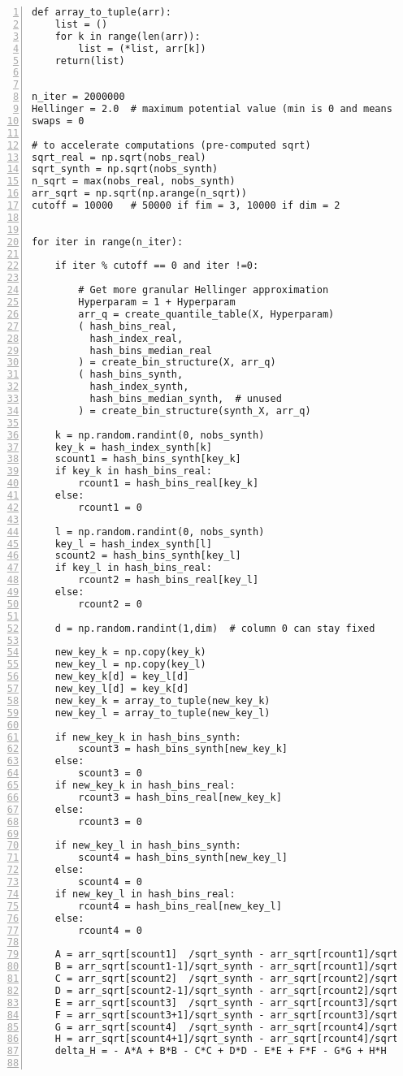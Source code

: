 \documentclass[oneside,10pt]{book}
\begin{document}
\begin{lstlisting}[numbers=left]
def array_to_tuple(arr):
    list = ()
    for k in range(len(arr)):
        list = (*list, arr[k])
    return(list)


n_iter = 2000000  
Hellinger = 2.0  # maximum potential value (min is 0 and means perfect fit)
swaps = 0

# to accelerate computations (pre-computed sqrt)
sqrt_real = np.sqrt(nobs_real)
sqrt_synth = np.sqrt(nobs_synth)
n_sqrt = max(nobs_real, nobs_synth) 
arr_sqrt = np.sqrt(np.arange(n_sqrt))
cutoff = 10000   # 50000 if fim = 3, 10000 if dim = 2


for iter in range(n_iter):

    if iter % cutoff == 0 and iter !=0:   

        # Get more granular Hellinger approximation
        Hyperparam = 1 + Hyperparam   
        arr_q = create_quantile_table(X, Hyperparam)
        ( hash_bins_real, 
          hash_index_real, 
          hash_bins_median_real 
        ) = create_bin_structure(X, arr_q)
        ( hash_bins_synth, 
          hash_index_synth,
          hash_bins_median_synth,  # unused
        ) = create_bin_structure(synth_X, arr_q)

    k = np.random.randint(0, nobs_synth) 
    key_k = hash_index_synth[k]
    scount1 = hash_bins_synth[key_k]
    if key_k in hash_bins_real:
        rcount1 = hash_bins_real[key_k]
    else:
        rcount1 = 0

    l = np.random.randint(0, nobs_synth)  
    key_l = hash_index_synth[l]
    scount2 = hash_bins_synth[key_l]
    if key_l in hash_bins_real:
        rcount2 = hash_bins_real[key_l]
    else:
        rcount2 = 0

    d = np.random.randint(1,dim)  # column 0 can stay fixed

    new_key_k = np.copy(key_k)
    new_key_l = np.copy(key_l)
    new_key_k[d] = key_l[d]
    new_key_l[d] = key_k[d]
    new_key_k = array_to_tuple(new_key_k)
    new_key_l = array_to_tuple(new_key_l)

    if new_key_k in hash_bins_synth:
        scount3 = hash_bins_synth[new_key_k]
    else:
        scount3 = 0
    if new_key_k in hash_bins_real:
        rcount3 = hash_bins_real[new_key_k]
    else:
        rcount3 = 0

    if new_key_l in hash_bins_synth:
        scount4 = hash_bins_synth[new_key_l]
    else:
        scount4 = 0
    if new_key_l in hash_bins_real:
        rcount4 = hash_bins_real[new_key_l]
    else:
        rcount4 = 0

    A = arr_sqrt[scount1]  /sqrt_synth - arr_sqrt[rcount1]/sqrt_real
    B = arr_sqrt[scount1-1]/sqrt_synth - arr_sqrt[rcount1]/sqrt_real
    C = arr_sqrt[scount2]  /sqrt_synth - arr_sqrt[rcount2]/sqrt_real
    D = arr_sqrt[scount2-1]/sqrt_synth - arr_sqrt[rcount2]/sqrt_real
    E = arr_sqrt[scount3]  /sqrt_synth - arr_sqrt[rcount3]/sqrt_real
    F = arr_sqrt[scount3+1]/sqrt_synth - arr_sqrt[rcount3]/sqrt_real
    G = arr_sqrt[scount4]  /sqrt_synth - arr_sqrt[rcount4]/sqrt_real
    H = arr_sqrt[scount4+1]/sqrt_synth - arr_sqrt[rcount4]/sqrt_real
    delta_H = - A*A + B*B - C*C + D*D - E*E + F*F - G*G + H*H


\end{lstlisting}
\end{document}
